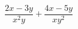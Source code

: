 \begin{ex}
	\begin{condition}
		\( \dfrac{2x-3y}{x^2y}+\dfrac{4x-5y}{xy^2} \)
	\end{condition}
\end{ex}